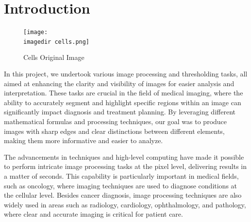 \documentclass[%
	a4paper, %
	12pt, %
	english, %
	bibtotoc %
]{scrartcl}
\newcommand{\imagedir}{./images/}
\newcommand{\todo}[1]{{\color{blue}{TODO: {#1}}}}
\begin{document}


\tableofcontents
\newpage







\section{Introduction}%
\label{sec:introduction}

\begin{figure}
    \centering
    \texttt{[image: \\imagedir cells.png]}
    \caption{Cells Original Image}
    \label{fig:figurecell}
\end{figure}


In this project, we undertook various image processing and thresholding tasks, all aimed at enhancing the clarity and visibility of images for easier analysis and interpretation. These tasks are crucial in the field of medical imaging, where the ability to accurately segment and highlight specific regions within an image can significantly impact diagnosis and treatment planning. By leveraging different mathematical formulas and processing techniques, our goal was to produce images with sharp edges and clear distinctions between different elements, making them more informative and easier to analyze.

The advancements in techniques and high-level computing have made it possible to perform intricate image processing tasks at the pixel level, delivering results in a matter of seconds. This capability is particularly important in medical fields, such as oncology, where imaging techniques are used to diagnose conditions at the cellular level. Besides cancer diagnosis, image processing techniques are also widely used in areas such as radiology, cardiology, ophthalmology, and pathology, where clear and accurate imaging is critical for patient care.
\end{document}
